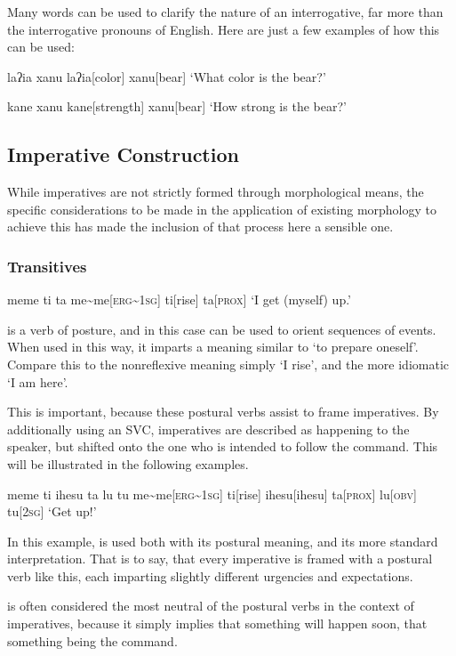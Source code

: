 Many words can be used to clarify the nature of an interrogative, far more than the interrogative pronouns of English.
Here are just a few examples of how this can be used:

\begin{paracol}{2}
\ex
\begingl
\glpreamble laʔia xanu
\endpreamble
laʔia[color]
xanu[bear]
\glft `What color is the bear?'
\endgl
\xe
\switchcolumn

\ex
\begingl
\glpreamble kane xanu
\endpreamble
kane[strength]
xanu[bear]
\glft `How strong is the bear?'
\endgl
\xe
\end{paracol}

\subsection{Imperative Construction}

While imperatives are not strictly formed through morphological means, the specific considerations to be made in the application of existing morphology to achieve this has made the inclusion of that process here a sensible one.

\subsubsection{Transitives}
\ex
\begingl
\glpreamble meme ti ta
\endpreamble
me\textasciitilde me[\textsc{erg\textasciitilde1sg}]
ti[rise]
ta[\textsc{prox}]
\glft `I get (myself) up.'
\endgl
\xe

 is a verb of posture, and in this case can be used to orient sequences of events.
When used in this way, it imparts a meaning similar to `to prepare oneself'.
Compare this to the nonreflexive meaning simply `I rise', and the more idiomatic `I am here'.

This is important, because these postural verbs assist to frame imperatives.
By additionally using an SVC, imperatives are described as happening to the speaker, but shifted onto the one who is intended to follow the command.
This will be illustrated in the following examples.

\ex
\begingl
\glpreamble meme ti ihesu ta lu tu
\endpreamble
me\textasciitilde me[\textsc{erg\textasciitilde1sg}]
ti[rise]
ihesu[ihesu]
ta[\textsc{prox}]
lu[\textsc{obv}]
tu[\textsc{2sg}]
\glft `Get up!'
\endgl
\xe

In this example,  is used both with its postural meaning, and its more standard interpretation.
That is to say, that every imperative is framed with a postural verb like this, each imparting slightly different urgencies and expectations.

 is often considered the most neutral of the postural verbs in the context of imperatives, because it simply implies that something will happen soon, that something being the command.